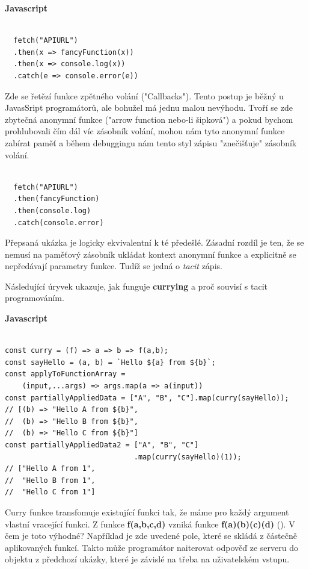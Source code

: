 \documentclass[male,czech]{kithesis}
\begin{document}
\textbf{Javascript}
\begin{verbatim}

  fetch("APIURL")
  .then(x => fancyFunction(x))
  .then(x => console.log(x))
  .catch(e => console.error(e))

\end{verbatim}

Zde se řetězí funkce zpětného volání ("Callbacks"). 
Tento postup je běžný u JavasSript programátorů,
ale bohužel má jednu malou nevýhodu.
Tvoří se zde zbytečná anonymní funkce ("arrow function nebo-li šipková") 
a pokud bychom prohlubovali čím dál víc zásobník volání,
mohou nám tyto anonymní funkce zabírat paměť a 
během debuggingu nám tento styl zápisu "znečišťuje" 
zásobník volání. 

\begin{verbatim}

  fetch("APIURL")
  .then(fancyFunction)
  .then(console.log)
  .catch(console.error)

\end{verbatim}

Přepsaná ukázka je logicky ekvivalentní k té předešlé. 
Zásadní rozdíl je ten, 
že se nemusí na paměťový zásobník ukládat kontext anonymní funkce 
a explicitně se nepředávají parametry funkce. 
Tudíž se jedná o \textit{tacit} zápis.

Následující úryvek ukazuje, 
jak funguje \textbf{currying} a proč souvisí s tacit programováním.

\textbf{Javascript}
\begin{verbatim}

const curry = (f) => a => b => f(a,b);
const sayHello = (a, b) = `Hello ${a} from ${b}`;
const applyToFunctionArray = 
    (input,...args) => args.map(a => a(input))
const partiallyAppliedData = ["A", "B", "C"].map(curry(sayHello)); 
// [(b) => "Hello A from ${b}", 
//  (b) => "Hello B from ${b}", 
//  (b) => "Hello C from ${b}"]
const partiallyAppliedData2 = ["A", "B", "C"]
                              .map(curry(sayHello)(1)); 
// ["Hello A from 1", 
//  "Hello B from 1", 
//  "Hello C from 1"]

\end{verbatim}
Curry funkce transfomuje existující funkci tak, 
že máme pro každý argument vlastní vracející funkci. 
Z funkce \textbf{f(a,b,c,d)} vzniká funkce \textbf{f(a)(b)(c)(d)} (\cite{Currying}).
V čem je toto výhodné?
Například je zde uvedené pole, 
které se skládá z částečně aplikovaných funkcí. 
Takto může programátor naiterovat odpověď ze serveru do objektu z předchozí ukázky,
které je závislé na třeba na uživatelském vstupu. 
\end{document}
